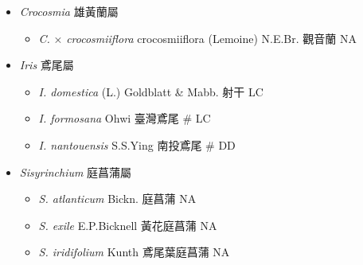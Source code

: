
  \begin{itemize}
 \item[] \textit{Crocosmia} 雄黃蘭屬
                                
  \begin{itemize}
        \item[] \textit{C.} × \textit{crocosmiiflora} crocosmiiflora (Lemoine) N.E.Br.  觀音蘭   NA
  \end{itemize}
 \item[] \textit{Iris} 鳶尾屬
                                
  \begin{itemize}
        \item[] \textit{I. domestica} (L.) Goldblatt \& Mabb.  射干   LC
        \item[] \textit{I. formosana} Ohwi  臺灣鳶尾  \# LC
        \item[] \textit{I. nantouensis} S.S.Ying  南投鳶尾  \# DD
  \end{itemize}
 \item[] \textit{Sisyrinchium} 庭菖蒲屬
                                
  \begin{itemize}
        \item[] \textit{S. atlanticum} Bickn.  庭菖蒲   NA
        \item[] \textit{S. exile} E.P.Bicknell  黃花庭菖蒲   NA
        \item[] \textit{S. iridifolium} Kunth  鳶尾葉庭菖蒲   NA
  \end{itemize}
  \end{itemize}
